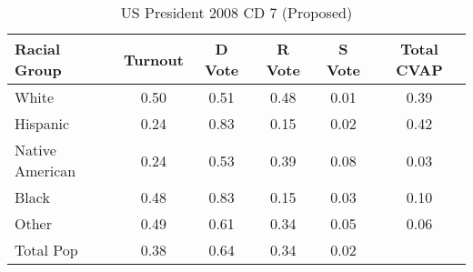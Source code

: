 \begin{table}[htb]
\begin{center}
\caption{US President 2008 CD 7 (Proposed)}
\label{pres08_cvap_cd_7}
\begin{tabular}{lccccc}
  \hline
Racial Group & Turnout & D Vote & R Vote & S Vote & Total CVAP \\ 
  \hline
White & 0.50 & 0.51 & 0.48 & 0.01 & 0.39 \\ 
  Hispanic & 0.24 & 0.83 & 0.15 & 0.02 & 0.42 \\ 
  Native American & 0.24 & 0.53 & 0.39 & 0.08 & 0.03 \\ 
  Black & 0.48 & 0.83 & 0.15 & 0.03 & 0.10 \\ 
  Other & 0.49 & 0.61 & 0.34 & 0.05 & 0.06 \\ 
  Total Pop & 0.38 & 0.64 & 0.34 & 0.02 &  \\ 
   \hline
\end{tabular}
\end{center}
\end{table}
